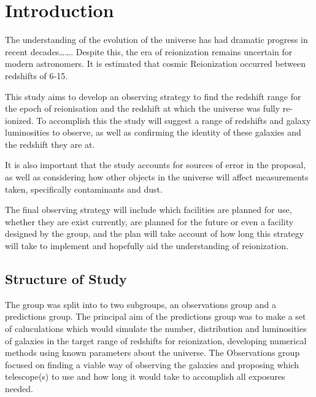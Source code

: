 
\section{Introduction} %
\label{section:Introduction}

The understanding of the evolution of the universe has had dramatic progress in recent decades……. Despite this, the era of reionization remains uncertain for modern astronomers. It is estimated that cosmic Reionization occurred between redshifts of 6-15. 


This study aims to develop an observing strategy to find the redshift range for the epoch of reionisation and the redshift at which the universe was fully re-ionized. To accomplish this the study will suggest a range of redshifts and galaxy luminosities to observe, as well as confirming the identity of these galaxies and the redshift they are at. 

It is also important that the study accounts for sources of error in the proposal, as well as considering how other objects in the universe will affect measurements taken, specifically contaminants and dust.

The final observing strategy will include which facilities are planned for use, whether they are exist currently, are planned for the future or even a facility designed by the group, and the plan will take account of how long this strategy will take to implement and hopefully aid the understanding of reionization.

    \subsection{Structure of Study} %
    \label{Structure_of_Study}

The group was split into to two subgroups, an observations group and a predictions group. The principal aim of the predictions group was to make a set of caluculations which would simulate the number, distribution and luminosities of galaxies in the target range of redshifts for reionization, developing numerical methods using known parameters about the universe. The Observations group focused on finding  a viable way of observing the galaxies and proposing which telescope(s) to use and how long it would take to accomplish all exposures needed.

